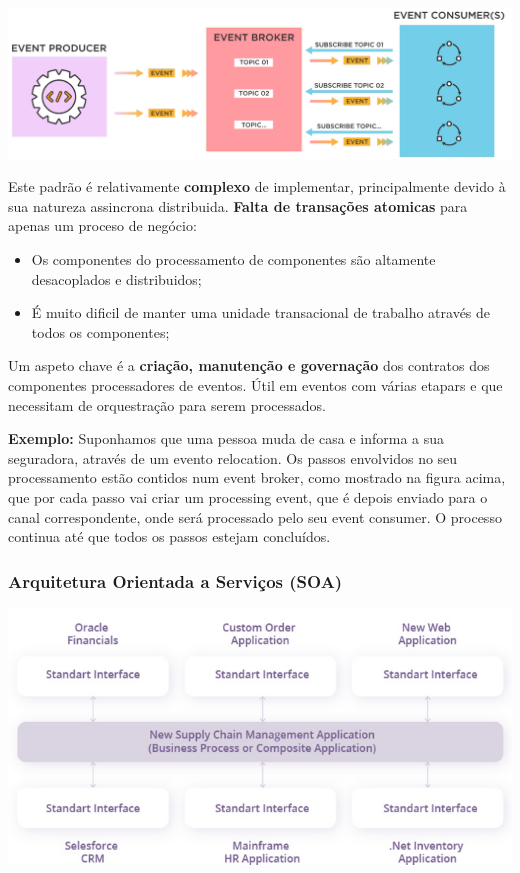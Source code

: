 \documentclass{article}
\begin{document}
\begin{center}
  \includegraphics[scale=0.55]{62}
\end{center}

Este padrão é relativamente \textbf{complexo} de implementar, principalmente
devido à sua natureza assincrona distribuida. \textbf{Falta de transações
atomicas} para apenas um proceso de negócio:
\begin{itemize}
  \item Os componentes do processamento de componentes são altamente
  desacoplados e distribuidos;
  \item É muito dificil de manter uma unidade transacional de trabalho
  através de todos os componentes;
\end{itemize}

Um aspeto chave é a \textbf{criação, manutenção e governação} dos contratos
dos componentes processadores de eventos. Útil em eventos com
várias etapars e que necessitam de orquestração para serem processados.

\vspace{2mm}

\begin{flushleft}
  \textbf{Exemplo:} Suponhamos que uma pessoa muda de casa e informa a sua
  seguradora, através de um evento relocation. Os passos envolvidos no seu processamento estão contidos num event
  broker, como mostrado na figura acima, que por cada passo vai criar um processing event, que é depois enviado
  para o canal correspondente, onde será processado pelo seu event consumer. O processo continua até que todos os
  passos estejam concluídos.
\end{flushleft}

\subsubsection{Arquitetura Orientada a Serviços (SOA)}

\begin{center}
  \includegraphics[scale=0.55]{63}
\end{center}
\end{document}
